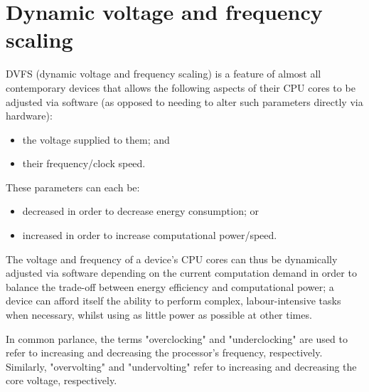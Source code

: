 \section{Dynamic voltage and frequency scaling}

DVFS (dynamic voltage and frequency scaling) is a feature of almost all
contemporary devices that allows the following aspects of their CPU cores to be
adjusted via software (as opposed to needing to alter such parameters directly
via hardware):
\begin{itemize}
    \item the voltage supplied to them; and
    \item their frequency/clock speed.
\end{itemize}

These parameters can each be:
\begin{itemize}
    \item decreased in order to decrease energy consumption; or
    \item increased in order to increase computational power/speed.
\end{itemize}

The voltage and frequency of a device's CPU cores can thus be dynamically
adjusted via software depending on the current computation demand in order to
balance the trade-off between energy efficiency and computational power; a
device can afford itself the ability to perform complex, labour-intensive tasks
when necessary, whilst using as little power as possible at other times.

In common parlance, the terms "overclocking" and "underclocking" are used to
refer to increasing and decreasing the processor's frequency, respectively.
Similarly, "overvolting" and "undervolting" refer to increasing and decreasing
the core voltage, respectively.

